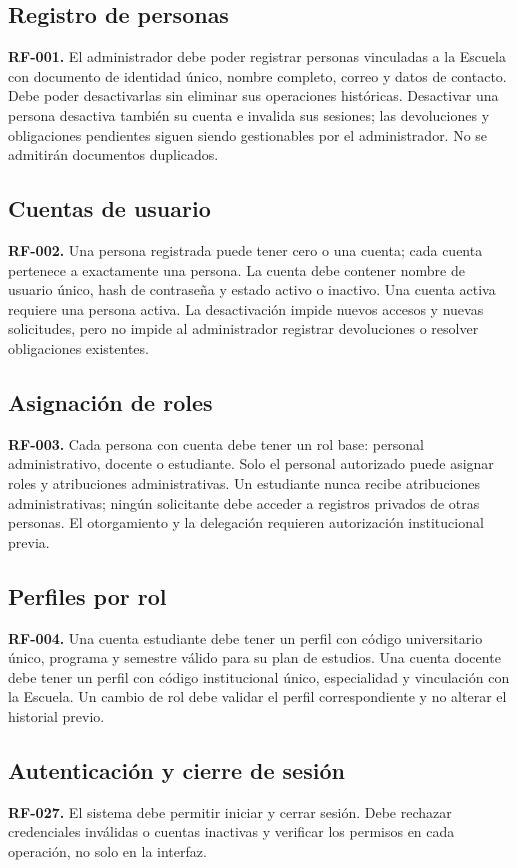 \subsection{Registro de personas}
\textbf{RF-001.} El administrador debe poder registrar personas vinculadas a la Escuela con documento de identidad \'unico, nombre completo, correo y datos de contacto. Debe poder desactivarlas sin eliminar sus operaciones hist\'oricas. Desactivar una persona desactiva tambi\'en su cuenta e invalida sus sesiones; las devoluciones y obligaciones pendientes siguen siendo gestionables por el administrador. No se admitir\'an documentos duplicados.

\subsection{Cuentas de usuario}
\textbf{RF-002.} Una persona registrada puede tener cero o una cuenta; cada cuenta pertenece a exactamente una persona. La cuenta debe contener nombre de usuario \'unico, hash de contrase\~na y estado activo o inactivo. Una cuenta activa requiere una persona activa. La desactivaci\'on impide nuevos accesos y nuevas solicitudes, pero no impide al administrador registrar devoluciones o resolver obligaciones existentes.

\subsection{Asignaci\'on de roles}
\textbf{RF-003.} Cada persona con cuenta debe tener un rol base: personal administrativo, docente o estudiante. Solo el personal autorizado puede asignar roles y atribuciones administrativas. Un estudiante nunca recibe atribuciones administrativas; ning\'un solicitante debe acceder a registros privados de otras personas. El otorgamiento y la delegaci\'on requieren autorizaci\'on institucional previa.

\subsection{Perfiles por rol}
\textbf{RF-004.} Una cuenta estudiante debe tener un perfil con c\'odigo universitario \'unico, programa y semestre v\'alido para su plan de estudios. Una cuenta docente debe tener un perfil con c\'odigo institucional \'unico, especialidad y vinculaci\'on con la Escuela. Un cambio de rol debe validar el perfil correspondiente y no alterar el historial previo.

\subsection{Autenticaci\'on y cierre de sesi\'on}
\textbf{RF-027.} El sistema debe permitir iniciar y cerrar sesi\'on. Debe rechazar credenciales inv\'alidas o cuentas inactivas y verificar los permisos en cada operaci\'on, no solo en la interfaz.

